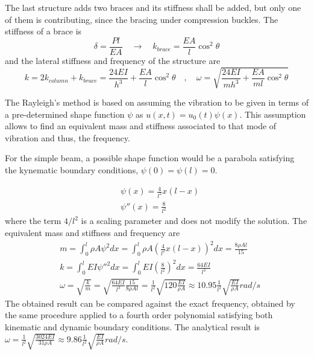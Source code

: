The last structure adds two braces and its stiffness shall be added, but only one of them is contributing, since the bracing under compression buckles. The stiffness of a brace is
$$
\delta = \frac{Pl}{EA} \quad \rightarrow \quad k_{brace} = \frac{EA}{l}\cos^2\theta
$$
and the lateral stiffness and frequency of the structure are
$$
k = 2k_{column} + k_{brace} = \frac{24EI}{h^3}+\frac{EA}{l}\cos^2\theta \quad , \quad 
\omega = \sqrt{\frac{24EI}{mh^3}+\frac{EA}{ml}\cos^2\theta}
$$



The Rayleigh's method is based on assuming the vibration to be given in terms of a pre-determined shape function $\psi$ as $u(x,t) = u_0(t)\psi(x)$. This assumption allows to find an equivalent mass and stiffness associated to that mode of vibration and thus, the frequency.

\parbox{.7\textwidth}{For the simple beam, a possible shape function would be a parabola satisfying the kynematic boundary conditions, $\psi(0) = \psi(l) = 0$.} \hspace{1em}
\parbox{.25\textwidth}{}
\begin{align*}
&\psi(x) = \frac{4}{l^2} x (l-x) \\
&\psi''(x) = \frac{8}{l^2}
\end{align*}
where the term $4/l^2$ is a scaling parameter and does not modify the solution. The equivalent mass and stiffness and frequency are
\begin{align*}
&m = \int_0^l \rho A\psi^2dx = \int_0^l \rho A \left(\frac{4}{l^2} x (l-x)\right)^2dx = \frac{8\rho Al}{15} \\
&k = \int_0^l EI \psi''^2 dx = \int_0^l EI \left(\frac{8}{l^2}\right)^2dx = \frac{64EI}{l^3} \\
&\omega = \sqrt{\frac{k}{m}} = \sqrt{\frac{64EI}{l^3}\frac{15}{8\rho Al}} = \frac{1}{l^2}\sqrt{120\frac{EI}{\rho A}} \approx 10.95\frac{1}{l^2}\sqrt{\frac{EI}{\rho A}} rad/s
\end{align*}
The obtained result can be compared against the exact frequency, obtained by the same procedure applied to a fourth order polynomial satisfying both kinematic and dynamic boundary conditions. The analytical result is $\omega = \frac{1}{l^2}\sqrt{\frac{3024EI}{31\rho A}} \approx 9.86\frac{1}{l^2}\sqrt{\frac{EI}{\rho A}} rad/s$.

